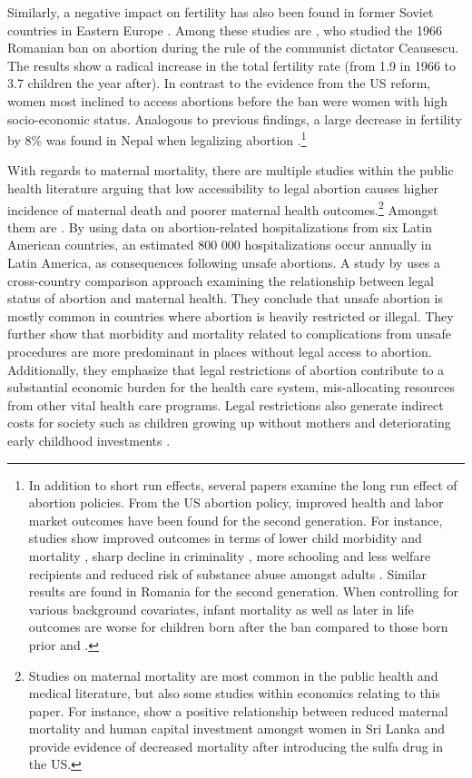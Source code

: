 \documentclass[a4paper, 11pt]{article}
\begin{document}
\begin{spacing}{2}
Similarly, a negative impact on fertility has also been found in former Soviet countries in Eastern Europe \citep{levine2004abortion}. Among these studies are \cite{Pop-Eleches}, who studied the 1966 Romanian ban on abortion during the rule of the communist dictator Ceausescu. The results show a radical increase in the total fertility rate (from 1.9 in 1966 to 3.7 children the year after). In contrast to the evidence from the US reform, women most inclined to access abortions before the ban were women with high socio-economic status. Analogous to previous findings, a large decrease in fertility by 8\% was found in Nepal when legalizing abortion \citep{Valente2010}.\footnote{In addition to short run effects, several papers examine the long run effect of abortion policies. From the US abortion policy, improved health and labor market outcomes have been found for the second generation. For instance, studies show improved outcomes in terms of lower child morbidity and mortality \citep{Gruberetal}, sharp decline in criminality \citep{DonohueLevitt2001}, more schooling and less welfare recipients \citep{ananat_abortion_2009} and reduced risk of substance abuse amongst adults \citep{CharlesStephens2002}. Similar results are found in Romania for the second generation. When controlling for various background covariates, infant mortality as well as later in life outcomes are worse for children born after the ban compared to those born prior \citep{Pop-Eleches} and \citep{Mitrut2011}.}



With regards to maternal mortality, there are multiple studies within the public health literature arguing that low accessibility to legal abortion causes higher incidence of maternal death and poorer maternal health outcomes.\footnote{Studies on maternal mortality are most common in the public health and medical literature, but also some studies within economics relating to this paper. For instance, \cite{jayachandran2008life} show a positive relationship between reduced maternal mortality and human capital investment amongst women in Sri Lanka and \cite{jayachandran2009modern} provide evidence of decreased mortality after introducing the sulfa drug in the US.} Amongst them are \cite{Singh2015}. By using data on abortion-related hospitalizations from six Latin American countries, an estimated 800 000 hospitalizations occur annually in Latin America, as consequences following unsafe abortions. A study by \cite{Grimes2006} uses a cross-country comparison approach examining the relationship between legal status of abortion and maternal health. They conclude that unsafe abortion is mostly common in countries where abortion is heavily restricted or illegal. They further show that morbidity and mortality related to complications from unsafe procedures are more predominant in places without legal access to abortion. Additionally, they emphasize that legal restrictions of abortion contribute to a substantial economic burden for the health care system, mis-allocating resources from other vital health care programs. Legal restrictions also generate indirect costs for society such as children growing up without mothers and deteriorating early childhood investments \citep{Grimes2006}. 



\end{spacing}
\end{document}
